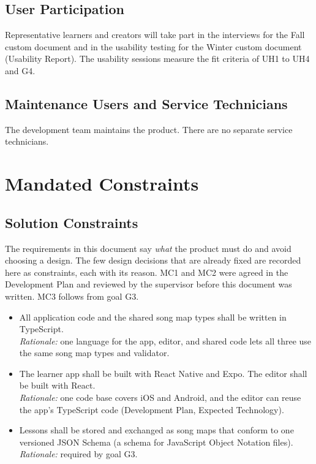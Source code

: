 \documentclass[12pt]{article}
\newcommand{\reqdef}[1]{\hypertarget{req:#1}{#1}}
\begin{document}
\subsection{User Participation}
Representative learners and creators will take part in the interviews for the
Fall custom document and in the usability testing for the Winter custom
document (Usability Report). The usability sessions measure the fit criteria
of UH1 to UH4 and G4.

\subsection{Maintenance Users and Service Technicians}
The development team maintains the product. There are no separate service
technicians.

\section{Mandated Constraints}
\subsection{Solution Constraints}
The requirements in this document say \emph{what} the product must do and
avoid choosing a design. The few design decisions that are already fixed are
recorded here as constraints, each with its reason. MC1 and MC2 were agreed in
the Development Plan and reviewed by the supervisor before this document was
written. MC3 follows from goal G3.
\begin{itemize}
    \item[\reqdef{MC1}] All application code and the shared song map types shall be
    written in TypeScript.
    \\\textit{Rationale:} one language for the app, editor, and shared code
    lets all three use the same song map types and validator.
    \item[\reqdef{MC2}] The learner app shall be built with React Native and Expo. The
    editor shall be built with React.
    \\\textit{Rationale:} one code base covers iOS and Android, and the editor
    can reuse the app's TypeScript code (Development Plan, Expected
    Technology).
    \item[\reqdef{MC3}] Lessons shall be stored and exchanged as song maps that conform
    to one versioned JSON Schema (a schema for JavaScript Object Notation
    files).
    \\\textit{Rationale:} required by goal G3.
\end{itemize}
\end{document}
